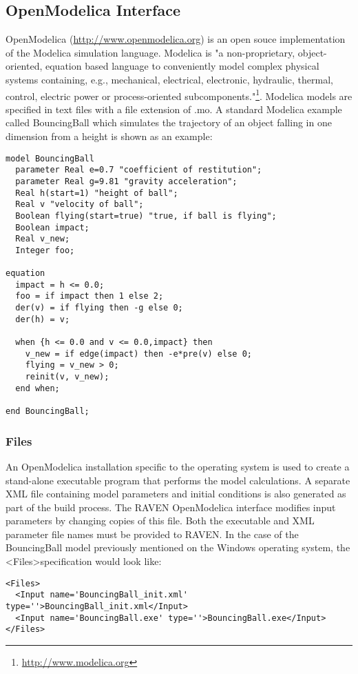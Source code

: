 \subsection{OpenModelica Interface}
OpenModelica (\url{http://www.openmodelica.org}) is an open souce implementation of the Modelica simulation language.  Modelica is "a non-proprietary, 
object-oriented, equation based language to conveniently model complex physical systems containing, e.g., mechanical, electrical, electronic, hydraulic, 
thermal, control, electric power or process-oriented subcomponents."\footnote{\url{http://www.modelica.org}}.  Modelica models are specified in text files 
with a file extension of .mo.  A standard Modelica example called BouncingBall which simulates the trajectory of an object falling in one dimension from a 
height is shown as an example:
\begin{lstlisting}
model BouncingBall
  parameter Real e=0.7 "coefficient of restitution";
  parameter Real g=9.81 "gravity acceleration";
  Real h(start=1) "height of ball";
  Real v "velocity of ball";
  Boolean flying(start=true) "true, if ball is flying";
  Boolean impact;
  Real v_new;
  Integer foo;

equation
  impact = h <= 0.0;
  foo = if impact then 1 else 2;
  der(v) = if flying then -g else 0;
  der(h) = v;

  when {h <= 0.0 and v <= 0.0,impact} then
    v_new = if edge(impact) then -e*pre(v) else 0;
    flying = v_new > 0;
    reinit(v, v_new);
  end when;

end BouncingBall;
\end{lstlisting}

\subsubsection{Files}
An OpenModelica installation specific to the operating system is used to create a stand-alone executable program that performs the model calculations.  
A separate XML file containing model parameters and initial conditions is also generated as part of the build process.  The RAVEN OpenModelica interface 
modifies input parameters by changing copies of this file.  Both the executable and XML parameter file names must be provided to RAVEN.  In the case of 
the BouncingBall model previously mentioned on the Windows operating system, the \textless Files\textgreater  specification would look like:
\begin{lstlisting}[style=XML]
<Files>
  <Input name='BouncingBall_init.xml' type=''>BouncingBall_init.xml</Input>
  <Input name='BouncingBall.exe' type=''>BouncingBall.exe</Input>
</Files>
\end{lstlisting}
